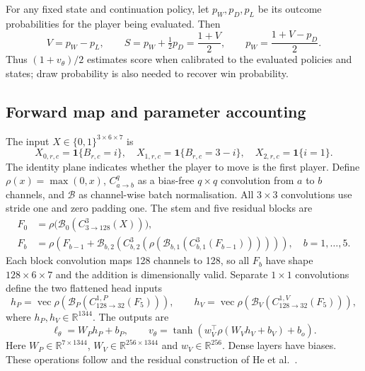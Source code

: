 \documentclass[letterpaper]{article}
\begin{document}
For any fixed state and continuation policy, let $p_W,p_D,p_L$ be its outcome
probabilities for the player being evaluated. Then
\begin{equation}
 V=p_W-p_L,\qquad
 S=p_W+\tfrac12p_D=\frac{1+V}{2},\qquad
 p_W=\frac{1+V-p_D}{2}.
 \label{eq:value-score}
\end{equation}
Thus $(1+v_\theta)/2$ estimates score when calibrated to the evaluated policies
and states; draw probability is also needed to recover win probability.

\subsection{Forward map and parameter accounting}
\label{app:network-math}
The input $X\in\{0,1\}^{3\times6\times7}$ is
\begin{equation}
 X_{0,r,c}=\mathbf1\{B_{r,c}=i\},\quad
 X_{1,r,c}=\mathbf1\{B_{r,c}=3-i\},\quad
 X_{2,r,c}=\mathbf1\{i=1\}.
 \label{eq:encoding}
\end{equation}
The identity plane indicates whether the player to move is the first player.
Define $\rho(x)=\max(0,x)$,
$C_{a\to b}^{q}$ as a bias-free $q\times q$ convolution from $a$ to $b$ channels,
and $\mathcal B$ as channel-wise batch normalisation. All $3\times3$ convolutions
use stride one and zero padding one. The stem and five residual blocks are
\begin{align}
 F_0 &=\rho\bigl(\mathcal B_0(C_{3\to128}^{3}(X))\bigr),\\
 F_b &=\rho\!\left(F_{b-1}+\mathcal B_{b,2}\!\left(
 C_{b,2}^{3}\!\left(\rho(\mathcal B_{b,1}(C_{b,1}^{3}(F_{b-1})))\right)
 \right)\right),\quad b=1,\ldots,5.
 \label{eq:residual-map}
\end{align}
Each block convolution maps 128 channels to 128, so all $F_b$ have shape
$128\times6\times7$ and the addition is dimensionally valid. Separate
$1\times1$ convolutions define the two flattened head inputs
\begin{equation}
 h_P=\operatorname{vec}\rho(\mathcal B_P(C_{128\to32}^{1,P}(F_5))),\qquad
 h_V=\operatorname{vec}\rho(\mathcal B_V(C_{128\to32}^{1,V}(F_5))),
 \label{eq:head-features}
\end{equation}
where $h_P,h_V\in\mathbb R^{1344}$. The outputs are
\begin{equation}
 \ell_\theta=W_Ph_P+b_P,\qquad
 v_\theta=\tanh\!\left(w_V^\top\rho(W_Vh_V+b_V)+b_o\right).
 \label{eq:heads}
\end{equation}
Here $W_P\in\mathbb R^{7\times1344}$, $W_V\in\mathbb R^{256\times1344}$ and
$w_V\in\mathbb R^{256}$. Dense layers have biases. These operations follow
 and the residual construction of He et al.~\cite{he2016}.
\end{document}
